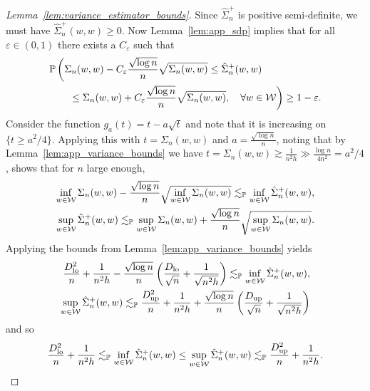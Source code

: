 \begin{proof}[Lemma~\ref{lem:variance_estimator_bounds}]

  Since $\hat \Sigma_n^+$ is positive semi-definite,
  we must have $\hat \Sigma_n^+(w,w) \geq 0$.
  Now Lemma~\ref{lem:app_sdp}
  implies that for all $\varepsilon \in (0,1)$
  there exists a $C_\varepsilon$ such that
  \begin{align*}
    &\mathbb{P}\left(
      \Sigma_n(w,w) - C_\varepsilon \frac{\sqrt{\log n}}{n} \sqrt{\Sigma_n(w,w)}
      \leq
      \hat \Sigma_n^+(w,w)
      \right.
      \\
      &\left.
      \qquad\leq
      \Sigma_n(w,w) + C_\varepsilon \frac{\sqrt{\log n}}{n} \sqrt{\Sigma_n(w,w)},
      \quad \forall w \in \mathcal{W}
    \right)
    \geq 1-\varepsilon.
  \end{align*}
  Consider the function
  $g_a(t) = t - a \sqrt{t}$
  and note that it is increasing on $\{t \geq a^2/4\}$.
  Applying this with $t = \Sigma_n(w,w)$
  and $a = \frac{\sqrt{\log n}}{n}$,
  noting that by Lemma~\ref{lem:app_variance_bounds} we have
  $t = \Sigma_n(w,w) \gtrsim \frac{1}{n^2h}
  \gg \frac{\log n}{4n^2} = a^2/4$,
  shows that for $n$ large enough,
  \begin{align*}
    \inf_{w \in \mathcal{W}} \Sigma_n(w,w)
    - \frac{\sqrt{\log n}}{n} \sqrt{\inf_{w \in \mathcal{W}} \Sigma_n(w,w)}
    \lesssim_{\mathbb{P}}
    \inf_{w \in \mathcal{W}}\hat \Sigma_n^+(w,w), \\
    \sup_{w \in \mathcal{W}}\hat \Sigma_n^+(w,w)
    \lesssim_{\mathbb{P}}
    \sup_{w \in \mathcal{W}} \Sigma_n(w,w)
    + \frac{\sqrt{\log n}}{n} \sqrt{\sup_{w \in \mathcal{W}} \Sigma_n(w,w)}.
  \end{align*}
  Applying the bounds from Lemma~\ref{lem:app_variance_bounds}
  yields
  \begin{align*}
    \frac{D_{\textup{lo}}^2}{n} + \frac{1}{n^2h}
    - \frac{\sqrt{\log n}}{n}
    \left( \frac{D_{\textup{lo}}}{\sqrt n} + \frac{1}{\sqrt{n^2h}} \right)
    \lesssim_{\mathbb{P}}
    \inf_{w \in \mathcal{W}}\hat \Sigma_n^+(w,w), \\
    \sup_{w \in \mathcal{W}}\hat \Sigma_n^+(w,w)
    \lesssim_{\mathbb{P}}
    \frac{D_{\textup{up}}^2}{n} + \frac{1}{n^2h}
    + \frac{\sqrt{\log n}}{n}
    \left( \frac{D_{\textup{up}}}{\sqrt n} + \frac{1}{\sqrt{n^2h}} \right)
  \end{align*}
  and so
  \begin{align*}
    \frac{D_{\textup{lo}}^2}{n} + \frac{1}{n^2h}
    \lesssim_{\mathbb{P}}
    \inf_{w \in \mathcal{W}}\hat \Sigma_n^+(w,w)
    \leq
    \sup_{w \in \mathcal{W}}\hat \Sigma_n^+(w,w)
    \lesssim_{\mathbb{P}}
    \frac{D_{\textup{up}}^2}{n} + \frac{1}{n^2h}.
  \end{align*}
\end{proof}

